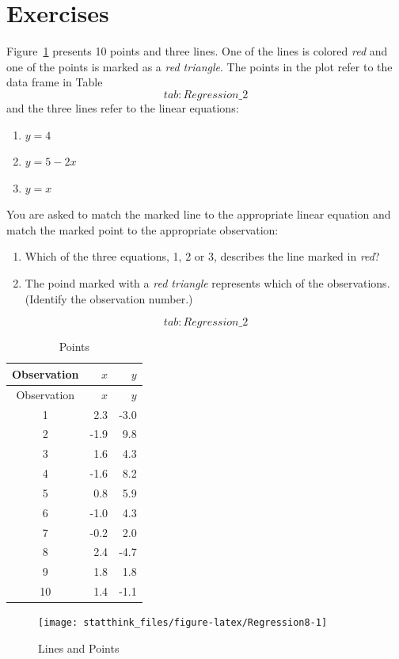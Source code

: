\documentclass[]{krantz}
\theoremstyle{definition}
\theoremstyle{definition}
\theoremstyle{definition}
\theoremstyle{remark}
\let\BeginKnitrBlock\begin \let\EndKnitrBlock\end
\begin{document}
\section{Exercises}\label{exercises-9}

\BeginKnitrBlock{exercise}
\protect\hypertarget{exr:unnamed-chunk-218}{}{\label{exr:unnamed-chunk-218}
}Figure~\ref{fig:Regression8} presents 10 points and three lines. One of
the lines is colored \emph{red} and one of the points is marked as a
\emph{red triangle}. The points in the plot refer to the data frame in
Table~\[tab:Regression\_2\] and the three lines refer to the linear
equations:

\begin{enumerate}
\def\labelenumi{\arabic{enumi}.}
\item
  \(y = 4\)
\item
  \(y = 5 - 2x\)
\item
  \(y = x\)
\end{enumerate}

You are asked to match the marked line to the appropriate linear
equation and match the marked point to the appropriate observation:

\begin{enumerate}
\def\labelenumi{\arabic{enumi}.}
\item
  Which of the three equations, 1, 2 or 3, describes the line marked in
  \emph{red}?
\item
  The poind marked with a \emph{red triangle} represents which of the
  observations. (Identify the observation number.)
\end{enumerate}

\[tab:Regression\_2\]

\begin{longtable}[]{@{}crr@{}}
\caption{Points}\tabularnewline
\toprule
Observation & \(x\) & \(y\)\tabularnewline
\midrule
\endfirsthead
\toprule
Observation & \(x\) & \(y\)\tabularnewline
\midrule
\endhead
1 & 2.3 & -3.0\tabularnewline
2 & -1.9 & 9.8\tabularnewline
3 & 1.6 & 4.3\tabularnewline
4 & -1.6 & 8.2\tabularnewline
5 & 0.8 & 5.9\tabularnewline
6 & -1.0 & 4.3\tabularnewline
7 & -0.2 & 2.0\tabularnewline
8 & 2.4 & -4.7\tabularnewline
9 & 1.8 & 1.8\tabularnewline
10 & 1.4 & -1.1\tabularnewline
\bottomrule
\end{longtable}
\EndKnitrBlock{exercise}

\begin{figure}

{\centering \texttt{[image: statthink\_files/figure-latex/Regression8-1]} 

}

\caption{Lines and Points}\label{fig:Regression8}
\end{figure}
\end{document}
